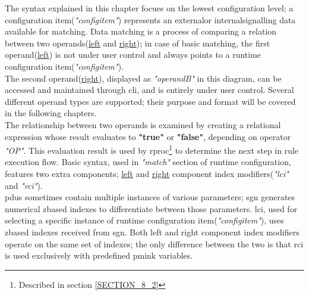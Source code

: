 \documentclass[a4paper,latin]{paper}
\begin{document}
\noindent{}The syntax explained in this chapter focues on the lowest configuration level; a configuration item(\textit{"config\textunderscore{}item"}) represents an 
external\footnotemark or internal\footnotemark[\value{footnote}] signalling data available
for matching. Data matching is a process of comparing a relation between two operands(\underline{left} and \underline{right}); in case of basic matching, the first 
operand(\underline{left}) is not under user control and always points to a runtime configuration item(\textit{"config\textunderscore{}item"}).\\
The second operand(\underline{right}), displayed as \textit{"operand\textunderscore{}B"} in this diagram, can be accessed and maintained through \acrfull{cli}, and is 
entirely under user control. Several different operand types are supported; their purpose and format will be covered in the following chapters. \\

The relationship between two operands is examined by creating a relational expression whose result evaluates to \textbf{"true"} or \textbf{"false"}, 
depending on operator \textit{"OP"}. This evaluation result is used by \acrfull{rproc}\footnote{Described in section \ref{SECTION_8_2}} to determine the next step 
in \gls{rule} execution flow. Basic syntax, used in \textit{"match"} section of runtime configuration, features two extra components; \underline{left} and \underline{right} 
component index modifiers(\textit{"\acrshort{lci}"} and \textit{"\acrshort{rci}"}).\\

\acrlong{pdu}s sometimes contain multiple instances of various parameters; \acrfull{sgn} generates numerical \gls{zbased} indexes to differentiate between those parameters.
\acrfull{lci}, used for selecting a specific instance of runtime configuration item(\textit{"config\textunderscore{}item"}), uses \gls{zbased} indexes received from \acrshort{sgn}.
Both left and right component index modifiers operate on the same set of indexes; the only difference between the two is that \acrfull{rci} is used exclusively with predefined
\acrshort{pmink} variables.\\
\end{document}
